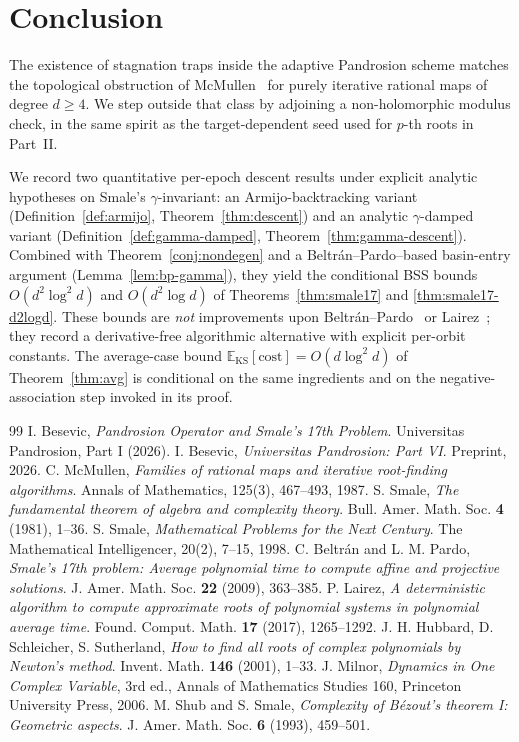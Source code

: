 \documentclass[11pt,a4paper]{article}
\begin{document}
\section{Conclusion}
The existence of stagnation traps inside the adaptive Pandrosion scheme matches the topological obstruction of McMullen~\cite{mcmullen} for purely iterative rational maps of degree $d \ge 4$. We step outside that class by adjoining a non-holomorphic modulus check, in the same spirit as the target-dependent seed used for $p$-th roots in Part~II.

We record two quantitative per-epoch descent results under explicit analytic hypotheses on Smale's $\gamma$-invariant: an Armijo-backtracking variant (Definition~\ref{def:armijo}, Theorem~\ref{thm:descent}) and an analytic $\gamma$-damped variant (Definition~\ref{def:gamma-damped}, Theorem~\ref{thm:gamma-descent}). Combined with Theorem~\ref{conj:nondegen} and a Beltr\'an--Pardo--based basin-entry argument (Lemma~\ref{lem:bp-gamma}), they yield the conditional BSS bounds $O(d^2 \log^2 d)$ and $O(d^2 \log d)$ of Theorems~\ref{thm:smale17} and \ref{thm:smale17-d2logd}. These bounds are \emph{not} improvements upon Beltr\'an--Pardo~\cite{beltranpardo} or Lairez~\cite{lairez}; they record a derivative-free algorithmic alternative with explicit per-orbit constants. The average-case bound $\mathbb{E}_{\text{KS}}[\text{cost}] = O(d \log^2 d)$ of Theorem~\ref{thm:avg} is conditional on the same ingredients and on the negative-association step invoked in its proof.

\begin{thebibliography}{99}
 I. Besevic, \textit{Pandrosion Operator and Smale's 17th Problem}. Universitas Pandrosion, Part I (2026).
 I. Besevic, \textit{Universitas Pandrosion: Part VI}. Preprint, 2026.
 C. McMullen, \textit{Families of rational maps and iterative root-finding algorithms}. Annals of Mathematics, 125(3), 467--493, 1987.
 S. Smale, \textit{The fundamental theorem of algebra and complexity theory}. Bull. Amer. Math. Soc. \textbf{4} (1981), 1--36.
 S. Smale, \textit{Mathematical Problems for the Next Century}. The Mathematical Intelligencer, 20(2), 7--15, 1998.
 C. Beltr\'an and L. M. Pardo, \textit{Smale's 17th problem: Average polynomial time to compute affine and projective solutions}. J. Amer. Math. Soc. \textbf{22} (2009), 363--385.
 P. Lairez, \textit{A deterministic algorithm to compute approximate roots of polynomial systems in polynomial average time}. Found. Comput. Math. \textbf{17} (2017), 1265--1292.
 J. H. Hubbard, D. Schleicher, S. Sutherland, \textit{How to find all roots of complex polynomials by Newton's method}. Invent. Math. \textbf{146} (2001), 1--33.
 J. Milnor, \textit{Dynamics in One Complex Variable}, 3rd ed., Annals of Mathematics Studies 160, Princeton University Press, 2006.
 M. Shub and S. Smale, \textit{Complexity of B\'ezout's theorem I: Geometric aspects}. J. Amer. Math. Soc. \textbf{6} (1993), 459--501.
\end{thebibliography}
\end{document}
